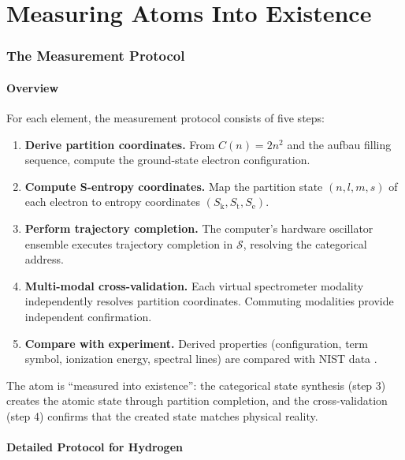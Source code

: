 \documentclass[11pt,twocolumn,a4paper]{article}
\theoremstyle{definition}
\theoremstyle{remark}
\newcommand{\Sk}{S_{\mathrm{k}}}
\newcommand{\St}{S_{\mathrm{t}}}
\newcommand{\Se}{S_{\mathrm{e}}}
\newcommand{\Sspace}{\mathcal{S}}
\begin{document}
\part{Measuring Atoms Into Existence}

\section{The Measurement Protocol}
\label{sec:measurement_protocol}

\subsection{Overview}

For each element, the measurement protocol consists of five steps:

\begin{enumerate}
\item \textbf{Derive partition coordinates.} From $C(n) = 2n^2$ and the aufbau filling sequence, compute the ground-state electron configuration.
\item \textbf{Compute S-entropy coordinates.} Map the partition state $(n, l, m, s)$ of each electron to entropy coordinates $(\Sk, \St, \Se)$.
\item \textbf{Perform trajectory completion.} The computer's hardware oscillator ensemble executes trajectory completion in $\Sspace$, resolving the categorical address.
\item \textbf{Multi-modal cross-validation.} Each virtual spectrometer modality independently resolves partition coordinates. Commuting modalities provide independent confirmation.
\item \textbf{Compare with experiment.} Derived properties (configuration, term symbol, ionization energy, spectral lines) are compared with NIST data \citep{nist_asd}.
\end{enumerate}

The atom is ``measured into existence'': the categorical state synthesis (step 3) creates the atomic state through partition completion, and the cross-validation (step 4) confirms that the created state matches physical reality.

\subsection{Detailed Protocol for Hydrogen}
\end{document}
